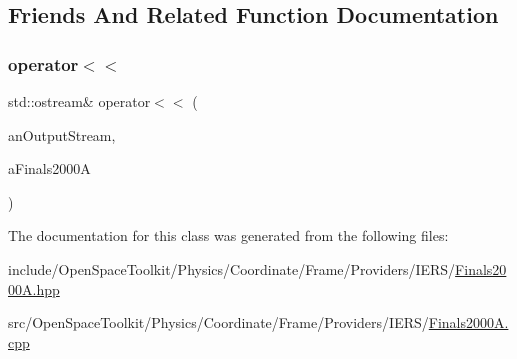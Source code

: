 \subsection{Friends And Related Function Documentation}
\mbox{\label{classostk_1_1physics_1_1coord_1_1frame_1_1provider_1_1iers_1_1_finals2000_a_ade92763eb1cb719a4a499af1beb72b43}} 
\subsubsection{\texorpdfstring{operator$<$$<$}{operator<<}}
{\footnotesize\ttfamily std\+::ostream\& operator$<$$<$ (\begin{DoxyParamCaption}\item[{std\+::ostream \&}]{an\+Output\+Stream,  }\item[{const \hyperlink{classostk_1_1physics_1_1coord_1_1frame_1_1provider_1_1iers_1_1_finals2000_a}{Finals2000A} \&}]{a\+Finals2000A }\end{DoxyParamCaption})\hspace{0.3cm}{\ttfamily [friend]}}



The documentation for this class was generated from the following files\+:\begin{DoxyCompactItemize}
\item 
include/\+Open\+Space\+Toolkit/\+Physics/\+Coordinate/\+Frame/\+Providers/\+I\+E\+R\+S/\hyperlink{_finals2000_a_8hpp}{Finals2000\+A.\+hpp}\item 
src/\+Open\+Space\+Toolkit/\+Physics/\+Coordinate/\+Frame/\+Providers/\+I\+E\+R\+S/\hyperlink{_finals2000_a_8cpp}{Finals2000\+A.\+cpp}\end{DoxyCompactItemize}

